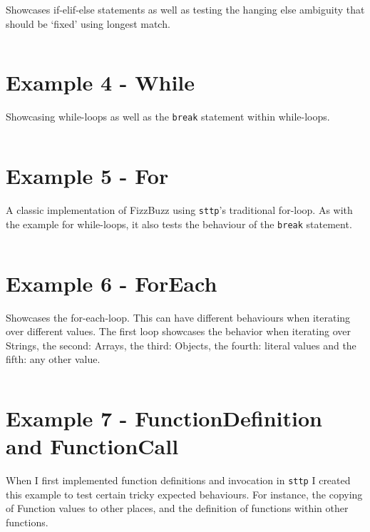 \documentclass[]{full}
\theoremstyle{definition}
\begin{document}
Showcases if-elif-else statements as well as testing the hanging else ambiguity that should be `fixed' using longest match.

\inputminted[autogobble, breaklines, tabsize=4]{text}{../../src/_examples/example_03/example_03.sttp}

\section{Example 4 - While}
\label{appendix:sttp-examples-4}

Showcasing while-loops as well as the \verb|break| statement within while-loops.

\inputminted[autogobble, breaklines, tabsize=4]{text}{../../src/_examples/example_04/example_04.sttp}

\section{Example 5 - For}
\label{appendix:sttp-examples-5}

A classic implementation of FizzBuzz using \verb|sttp|'s traditional for-loop. As with the example for while-loops, it also tests the behaviour of the \verb|break| statement.

\inputminted[autogobble, breaklines, tabsize=4]{text}{../../src/_examples/example_05/example_05.sttp}

\section{Example 6 - ForEach}
\label{appendix:sttp-examples-6}

Showcases the for-each-loop. This can have different behaviours when iterating over different values. The first loop showcases the behavior when iterating over Strings, the second: Arrays, the third: Objects, the fourth: literal values and the fifth: any other value.

\inputminted[autogobble, breaklines, tabsize=4]{text}{../../src/_examples/example_06/example_06.sttp}

\section{Example 7 - FunctionDefinition and FunctionCall}
\label{appendix:sttp-examples-7}

When I first implemented function definitions and invocation in \verb|sttp| I created this example to test certain tricky expected behaviours. For instance, the copying of Function values to other places, and the definition of functions within other functions.
\end{document}
